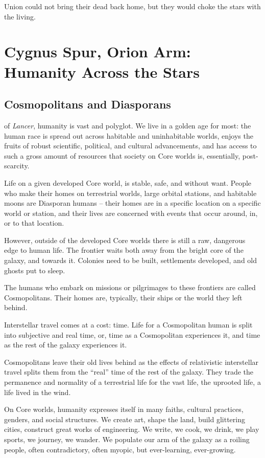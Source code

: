 Union could not bring their dead back home, but they would choke the stars with the living.

\section{Cygnus Spur, Orion Arm: Humanity Across the Stars}

\subsection{Cosmopolitans and Diasporans}

 of \textit{Lancer}, humanity is vast and polyglot. We live in a golden age
for most: the human race is spread out across habitable and uninhabitable worlds, enjoys the
fruits of robust scientific, political, and cultural advancements, and has access to such a gross
amount of resources that society on Core worlds is, essentially, post-scarcity.

Life on a given developed Core world, is stable, safe, and without want. People who make their
homes on terrestrial worlds, large orbital stations, and habitable moons are Diasporan humans --
their homes are in a specific location on a specific world or station, and their lives are concerned
with events that occur around, in, or to that location.

However, outside of the developed Core worlds there is still a raw, dangerous edge to human life.
The frontier waits both away from the bright core of the galaxy, and towards it. Colonies need to
be built, settlements developed, and old ghosts put to sleep.

The humans who embark on missions or pilgrimages to these frontiers are called Cosmopolitans.
Their homes are, typically, their ships or the world they left behind.

Interstellar travel comes at a cost: time. Life for a Cosmopolitan human is split into subjective
and real time, or, time as a Cosmopolitan experiences it, and time as the rest of the galaxy
experiences it.

Cosmopolitans leave their old lives behind as the effects of relativistic interstellar travel splits
them from the “real” time of the rest of the galaxy. They trade the permanence and normality of a
terrestrial life for the vast life, the uprooted life, a life lived in the wind.

On Core worlds, humanity expresses itself in many faiths, cultural practices, genders, and social
structures. We create art, shape the land, build glittering cities, construct great works of
engineering. We write, we cook, we drink, we play sports, we journey, we wander. We populate
our arm of the galaxy as a roiling people, often contradictory, often myopic, but ever-learning,
ever-growing.

